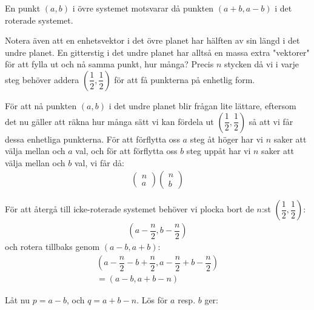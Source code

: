 \documentclass{tufte-handout}
\begin{document}
\begin{ans}
  \par\bigskip
  \noindent En punkt $(a,b)$ i övre systemet motsvarar då punkten $(a+b,a-b)$ i det roterade systemet. 
  \par\bigskip
  \noindent Notera även att en enhetsvektor i det övre planet har hälften av sin längd i det undre planet. En gitterstig i det undre planet har alltså en massa extra "vektorer" för att fylla ut och nå samma punkt, hur många? Precis $n$ stycken då vi i varje steg behöver addera $\left(\dfrac{1}{2}, \dfrac{1}{2}\right)$ för att få punkterna på enhetlig form.
  \par\bigskip
  \noindent För att nå punkten $(a,b)$ i det undre planet blir frågan lite lättare, eftersom det nu gäller att räkna hur många sätt vi kan fördela ut $\left(\dfrac{1}{2}, \dfrac{1}{2}\right)$ så att vi får dessa enhetliga punkterna. För att förflytta oss $a$ steg åt höger har vi $n$ saker att välja mellan och $a$ val, och för att förflytta oss $b$ steg uppåt har vi $n$ saker att välja mellan och $b$ val, vi får då:
  \begin{equation}
    \begin{gathered}
      \begin{pmatrix}n\\a\end{pmatrix}\begin{pmatrix}n\\b\end{pmatrix}
    \end{gathered}
  \end{equation}
  \par\bigskip
  \noindent För att återgå till icke-roterade systemet behöver vi plocka bort de $n$:st $\left(\dfrac{1}{2}, \dfrac{1}{2}\right)$:
  \begin{equation*}
    \begin{gathered}
      \left(a-\dfrac{n}{2}, b-\dfrac{n}{2}\right)
    \end{gathered}
  \end{equation*}och rotera tillbaks genom $(a-b, a+b)$:
  \begin{equation*}
    \begin{gathered}
      \left(a-\dfrac{n}{2}-b+\dfrac{n}{2}, a-\dfrac{n}{2}+b-\dfrac{n}{2}\right)\\
      = \left(a-b,a+b-n\right)
    \end{gathered}
  \end{equation*}
  \par\bigskip
  \noindent Låt nu $p = a-b$, och $q = a+b-n$. Lös för $a$ resp. $b$ ger:

\end{ans}
\end{document}
